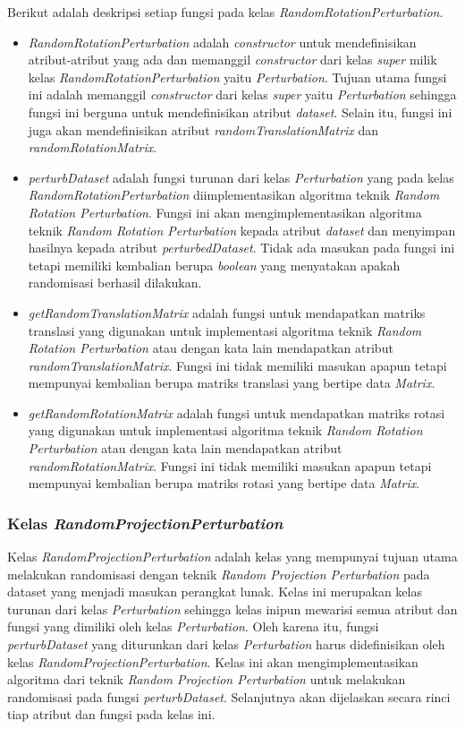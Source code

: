 Berikut adalah deskripsi setiap fungsi pada kelas \textit{RandomRotationPerturbation}.
\begin{itemize}
	\item \textit{RandomRotationPerturbation} adalah \textit{constructor} untuk mendefinisikan atribut-atribut yang ada dan memanggil \textit{constructor} dari kelas \textit{super} milik kelas \textit{RandomRotationPerturbation} yaitu \textit{Perturbation}. Tujuan utama fungsi ini adalah memanggil \textit{constructor} dari kelas \textit{super} yaitu \textit{Perturbation} sehingga fungsi ini berguna untuk mendefinisikan atribut \textit{dataset}. Selain itu, fungsi ini juga akan mendefinisikan atribut \textit{randomTranslationMatrix} dan \textit{randomRotationMatrix}.
	\item \textit{perturbDataset} adalah fungsi turunan dari kelas \textit{Perturbation} yang pada kelas \textit{RandomRotationPerturbation} diimplementasikan algoritma teknik \textit{Random Rotation Perturbation}. Fungsi ini akan mengimplementasikan algoritma teknik \textit{Random Rotation Perturbation} kepada atribut \textit{dataset} dan menyimpan hasilnya kepada atribut \textit{perturbedDataset}. Tidak ada masukan pada fungsi ini tetapi memiliki kembalian berupa \textit{boolean} yang menyatakan apakah randomisasi berhasil dilakukan.
	\item \textit{getRandomTranslationMatrix} adalah fungsi untuk mendapatkan matriks translasi yang digunakan untuk implementasi algoritma teknik \textit{Random Rotation Perturbation} atau dengan kata lain mendapatkan atribut \textit{randomTranslationMatrix}. Fungsi ini tidak memiliki masukan apapun tetapi mempunyai kembalian berupa matriks translasi yang bertipe data \textit{Matrix}.
	\item \textit{getRandomRotationMatrix} adalah fungsi untuk mendapatkan matriks rotasi yang digunakan untuk implementasi algoritma teknik \textit{Random Rotation Perturbation} atau dengan kata lain mendapatkan atribut \textit{randomRotationMatrix}. Fungsi ini tidak memiliki masukan apapun tetapi mempunyai kembalian berupa matriks rotasi yang bertipe data \textit{Matrix}.
\end{itemize}

\subsubsection{Kelas \textit{RandomProjectionPerturbation}}
\label{subsubsec:kelas-rpp}

Kelas \textit{RandomProjectionPerturbation} adalah kelas yang mempunyai tujuan utama melakukan randomisasi dengan teknik \textit{Random Projection Perturbation} pada dataset yang menjadi masukan perangkat lunak. Kelas ini merupakan kelas turunan dari kelas \textit{Perturbation} sehingga kelas inipun mewarisi semua atribut dan fungsi yang dimiliki oleh kelas \textit{Perturbation}. Oleh karena itu, fungsi \textit{perturbDataset} yang diturunkan dari kelas \textit{Perturbation} harus didefinisikan oleh kelas \textit{RandomProjectionPerturbation}. Kelas ini akan mengimplementasikan algoritma dari teknik \textit{Random Projection Perturbation} untuk melakukan randomisasi pada fungsi \textit{perturbDataset}. Selanjutnya akan dijelaskan secara rinci tiap atribut dan fungsi pada kelas ini.

